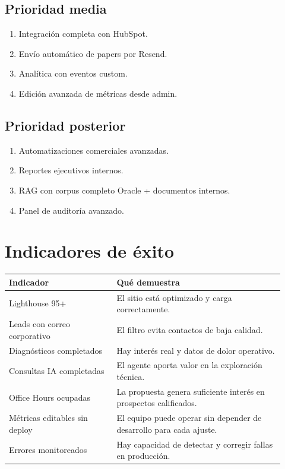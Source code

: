 \documentclass[11pt,letterpaper]{article}
\begin{document}
\subsection{Prioridad media}

\begin{enumerate}
\item Integraci\'on completa con HubSpot.
\item Env\'io autom\'atico de papers por Resend.
\item Anal\'itica con eventos custom.
\item Edici\'on avanzada de m\'etricas desde admin.
\end{enumerate}

\subsection{Prioridad posterior}

\begin{enumerate}
\item Automatizaciones comerciales avanzadas.
\item Reportes ejecutivos internos.
\item RAG con corpus completo Oracle + documentos internos.
\item Panel de auditor\'ia avanzado.
\end{enumerate}

\section{Indicadores de \'exito}

\begin{longtable}{p{0.36\linewidth}p{0.56\linewidth}}
\toprule
\textbf{Indicador} & \textbf{Qu\'e demuestra} \\
\midrule
Lighthouse 95+ & El sitio est\'a optimizado y carga correctamente. \\
Leads con correo corporativo & El filtro evita contactos de baja calidad. \\
Diagn\'osticos completados & Hay inter\'es real y datos de dolor operativo. \\
Consultas IA completadas & El agente aporta valor en la exploraci\'on t\'ecnica. \\
Office Hours ocupadas & La propuesta genera suficiente inter\'es en prospectos calificados. \\
M\'etricas editables sin deploy & El equipo puede operar sin depender de desarrollo para cada ajuste. \\
Errores monitoreados & Hay capacidad de detectar y corregir fallas en producci\'on. \\
\bottomrule
\end{longtable}
\end{document}
